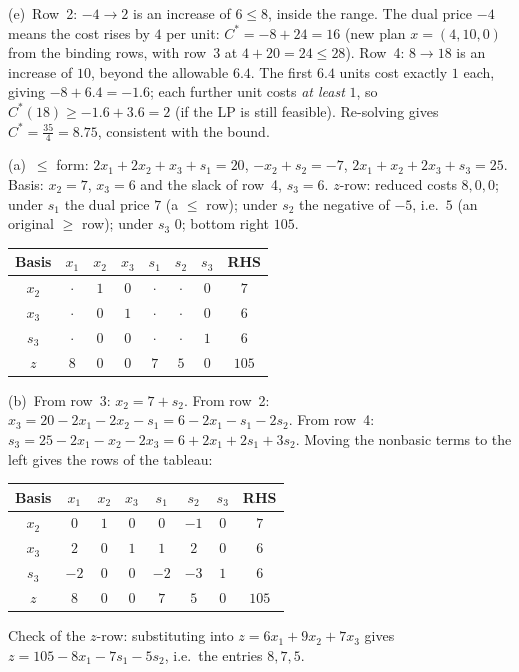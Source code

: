 \begin{solutions}
        (e)~Row~2: $-4\to 2$ is an increase of $6\le 8$, inside the range.
        The dual price $-4$ means the cost rises by $4$ per unit:
        $C^{*}=-8+24=16$ (new plan $x=(4,10,0)$ from the binding rows,
        with row~3 at $4+20=24\le 28$). Row~4: $8\to 18$ is an increase of
        $10$, beyond the allowable $6.4$. The first $6.4$ units cost exactly
        $1$ each, giving $-8+6.4=-1.6$; each further unit costs \emph{at
        least} $1$, so $C^{*}(18)\ge -1.6+3.6=2$ (if the LP is still
        feasible). Re-solving gives $C^{*}=\tfrac{35}{4}=8.75$, consistent
        with the bound.

  \item (a)~$\le$ form: $2x_{1}+2x_{2}+x_{3}+s_{1}=20$,
        $-x_{2}+s_{2}=-7$, $2x_{1}+x_{2}+2x_{3}+s_{3}=25$. Basis: $x_{2}=7$,
        $x_{3}=6$ and the slack of row~4, $s_{3}=6$. $z$-row: reduced costs
        $8,0,0$; under $s_{1}$ the dual price $7$ (a $\le$ row); under
        $s_{2}$ the negative of $-5$, i.e.\ $5$ (an original $\ge$ row);
        under $s_{3}$ $0$; bottom right $105$.
        \begin{center}\footnotesize
        \begin{tabular}{c|cccccc|c}
        Basis & $x_{1}$ & $x_{2}$ & $x_{3}$ & $s_{1}$ & $s_{2}$ & $s_{3}$ & RHS\\
        \hline
        $x_{2}$ & $\cdot$ & $1$ & $0$ & $\cdot$ & $\cdot$ & $0$ & $7$\\
        $x_{3}$ & $\cdot$ & $0$ & $1$ & $\cdot$ & $\cdot$ & $0$ & $6$\\
        $s_{3}$ & $\cdot$ & $0$ & $0$ & $\cdot$ & $\cdot$ & $1$ & $6$\\
        \hline
        $z$ & $8$ & $0$ & $0$ & $7$ & $5$ & $0$ & $105$\\
        \end{tabular}
        \end{center}
        (b)~From row~3: $x_{2}=7+s_{2}$. From row~2:
        $x_{3}=20-2x_{1}-2x_{2}-s_{1}=6-2x_{1}-s_{1}-2s_{2}$. From row~4:
        $s_{3}=25-2x_{1}-x_{2}-2x_{3}=6+2x_{1}+2s_{1}+3s_{2}$. Moving the
        nonbasic terms to the left gives the rows of the tableau:
        \begin{center}\footnotesize
        \begin{tabular}{c|cccccc|c}
        Basis & $x_{1}$ & $x_{2}$ & $x_{3}$ & $s_{1}$ & $s_{2}$ & $s_{3}$ & RHS\\
        \hline
        $x_{2}$ & $0$ & $1$ & $0$ & $0$ & $-1$ & $0$ & $7$\\
        $x_{3}$ & $2$ & $0$ & $1$ & $1$ & $2$ & $0$ & $6$\\
        $s_{3}$ & $-2$ & $0$ & $0$ & $-2$ & $-3$ & $1$ & $6$\\
        \hline
        $z$ & $8$ & $0$ & $0$ & $7$ & $5$ & $0$ & $105$\\
        \end{tabular}
        \end{center}
        Check of the $z$-row: substituting into $z=6x_{1}+9x_{2}+7x_{3}$
        gives $z=105-8x_{1}-7s_{1}-5s_{2}$, i.e.\ the entries $8,7,5$.
        \checkmark


\end{solutions}
